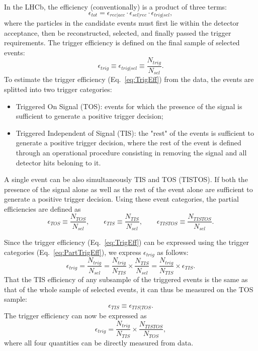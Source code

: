  In the LHCb, the efficiency (conventionally) is a product of three terms:
 \begin{equation}
  \epsilon_{tot} = \epsilon_{rec|acc}\cdot\epsilon_{sel|rec}\cdot\epsilon_{trig|sel},
 \end{equation}
 where the particles in the candidate events must first lie within the detector acceptance, then be reconstructed, selected, and finally passed the trigger requirements. The trigger efficiency is defined on the final sample of selected events:
 \begin{equation}\label{eq:TrigEff}
  \epsilon_{trig}\equiv\epsilon_{trig|sel}\equiv\frac{N_{trig}}{N_{sel}}.
 \end{equation}
 To estimate the trigger efficiency (Eq.~\ref{eq:TrigEff}) from the data, the events are splitted into two trigger categories:
 \begin{itemize}
  \item Triggered On Signal (TOS): events for which the presence of the signal is sufficient to generate a positive trigger decision;
  \item Triggered Independent of Signal (TIS): the "rest" of the events is sufficient to generate a positive trigger decision, where the rest of the event is defined through an operational procedure consisting in removing the signal and all detector hits beloning to it.
 \end{itemize}
A single event can be also simultaneously TIS and TOS (TISTOS). If both the presence of the signal alone as well as the rest of the event alone are sufficient to generate a positive trigger decision. Using these event categories, the partial efficiencies are defined as
\begin{equation}\label{eq:PartTrigEff}
 \epsilon_{TOS}\equiv\frac{N_{TOS}}{N_{sel}},\qquad\epsilon_{TIS}\equiv\frac{N_{TIS}}{N_{sel}},\qquad\epsilon_{TISTOS}\equiv\frac{N_{TISTOS}}{N_{sel}}.
\end{equation}

Since the trigger efficiency (Eq.~\ref{eq:TrigEff}) can be expressed using the trigger categories (Eq.~\ref{eq:PartTrigEff}), we express $\epsilon_{trig}$ as follows:
\begin{equation}
 \epsilon_{trig}=\frac{N_{trig}}{N_{sel}}=\frac{N_{trig}}{N_{TIS}}\times\frac{N_{TIS}}{N_{sel}}=\frac{N_{trig}}{N_{TIS}}\times\epsilon_{TIS}.
\end{equation}
That the TIS efficiency of any subsample of the triggered events is the same as that of the whole sample of selected events, it can thus be measured on the TOS sample:
\begin{equation}
 \epsilon_{TIS}\equiv\epsilon_{TIS|TOS}.
\end{equation}
The trigger efficiency can now be expressed as
\begin{equation}\label{eq:FinalTrigEff}
 \epsilon_{trig}=\frac{N_{trig}}{N_{TIS}}\times\frac{N_{TISTOS}}{N_{TOS}},
\end{equation}
where all four quantities can be directly measured from data.

